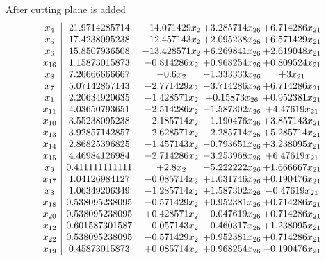 \documentclass[11pt]{article}
\begin{document}
 After cutting plane is added 
\[\begin{array}{c| c c@{\hskip 2pt} c@{\hskip 2pt} c@{\hskip 2pt} }
 x_{4}   &  21.9714285714 & -14.071429 x_{2} & + 3.285714 x_{26} & + 6.714286 x_{21}\\
 x_{5}   &  17.4238095238 & -12.457143 x_{2} & + 2.095238 x_{26} & + 6.571429 x_{21}\\
 x_{6}   &  15.8507936508 & -13.428571 x_{2} & + 6.269841 x_{26} & + 2.619048 x_{21}\\
 x_{16}   &  1.15873015873 & -0.814286 x_{2} & + 0.968254 x_{26} & + 0.809524 x_{21}\\
 x_{8}   &  7.26666666667 & -0.6 x_{2} & -1.333333 x_{26} & + 3 x_{21}\\
 x_{7}   &  5.07142857143 & -2.771429 x_{2} & -3.714286 x_{26} & + 6.714286 x_{21}\\
 x_{1}   &  2.20634920635 & -1.428571 x_{2} & + 0.15873 x_{26} & + 0.952381 x_{21}\\
 x_{11}   &  4.03650793651 & -2.514286 x_{2} & -1.587302 x_{26} & + 4.47619 x_{21}\\
 x_{10}   &  3.55238095238 & -2.185714 x_{2} & -1.190476 x_{26} & + 3.857143 x_{21}\\
 x_{13}   &  3.92857142857 & -2.628571 x_{2} & -2.285714 x_{26} & + 5.285714 x_{21}\\
 x_{14}   &  2.86825396825 & -1.457143 x_{2} & -0.793651 x_{26} & + 3.238095 x_{21}\\
 x_{15}   &  4.46984126984 & -2.714286 x_{2} & -3.253968 x_{26} & + 6.47619 x_{21}\\
 x_{9}   &  0.411111111111 & + 2.8 x_{2} & -5.222222 x_{26} & + 1.666667 x_{21}\\
 x_{17}   &  1.04126984127 & -0.085714 x_{2} & + 1.031746 x_{26} & + 0.190476 x_{21}\\
 x_{3}   &  1.06349206349 & -1.285714 x_{2} & + 1.587302 x_{26} & -0.47619 x_{21}\\
 x_{18}   &  0.538095238095 & -0.571429 x_{2} & + 0.952381 x_{26} & + 0.714286 x_{21}\\
 x_{20}   &  0.538095238095 & + 0.428571 x_{2} & -0.047619 x_{26} & + 0.714286 x_{21}\\
 x_{12}   &  0.601587301587 & -0.057143 x_{2} & -0.460317 x_{26} & + 1.238095 x_{21}\\
 x_{22}   &  0.538095238095 & -0.571429 x_{2} & + 0.952381 x_{26} & + 0.714286 x_{21}\\
 x_{19}   &  0.45873015873 & + 0.085714 x_{2} & + 0.968254 x_{26} & -0.190476 x_{21}\\

\end{array}\]
\end{document}
